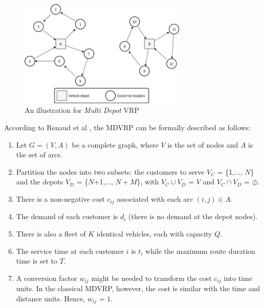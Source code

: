 \documentclass[conference]{IEEEtran}
\begin{document}
\begin{figure}[!]
	\centering
	\includegraphics[width=8cm]{Resources/Images/mdvrp-illustration}
	\caption{An illustration for \textit{Multi Depot} VRP}
	\label{fig:mdvrp-illustration}
\end{figure}


According to Renaud et al \cite{renaud_tabu_1996}, the MDVRP can be formally described as follows:
\begin{enumerate}
	\item Let $G = (V, A)$ be a complete graph, where $V$ is the set of nodes and $A$ is the set of arcs. 
	\item Partition the nodes into two subsets: the customers to serve $V_C$ = \{1,..., $N$\} and the depots $V_D$ = \{$N$+1,..., $N+M$\}, with $V_C \cup V_D$ = $V$ and $V_C \cap V_D$ = $\oslash$. 
	\item There is a non-negative cost $c_{ij}$ associated with each arc $(i, j) \in A$. 
	\item The demand of each customer is $d_i$ (there is no demand at the depot nodes).
	\item There is also a fleet of $K$ identical vehicles, each with capacity $Q$.
	\item The service time at each customer $i$ is $t_i$ while the maximum route duration time is set to $T$.
	\item A conversion factor $w_{ij}$ might be needed to transform the cost $c_{ij}$ into time units. In the classical MDVRP, however, the cost is similar with the time and distance units. Hence, $w_{ij}$ = $1$.
\end{enumerate} 


\end{document}

